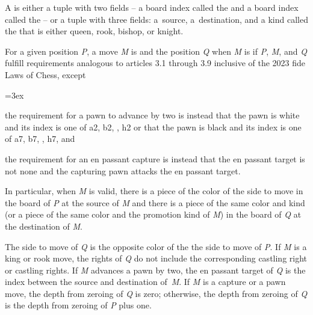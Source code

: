 \minor A  is either a tuple with two fields – a board index
called the  and a board index called the 
– or a tuple with three fields: a~source, a~destination, and a kind called
the  that is either queen, rook, bishop, or knight.

\minor For a given position {\it P}, a move {\it M} is  and the
position {\it Q}  when {\it M} is  if
{\it P}, {\it M}, and {\it Q} fulfill requirements analogous to articles 3.1
through 3.9 inclusive of the 2023 {\caps fide} Laws of Chess, except

{\leftskip=3ex

\parskip the requirement for a pawn to advance by two is instead that
the pawn is white and its index is one of a2, b2, \ellipsis\ot, h2 or that the
pawn is black and its index is one of a7, b7, \ellipsis\ot, h7, and

\parskip the requirement for an en passant capture is instead that
the en passant target is not none and the capturing pawn attacks the en passant
target.

}

In particular, when {\it M} is valid, there is a piece of the color of the side
to move in the board of {\it P} at the source of {\it M} and there is a piece
of the same color and kind (or a piece of the same color and the promotion kind
of {\it M}) in the board of {\it Q} at the destination of {\it M}.

The side to move of {\it Q} is the opposite color of the the side to move of
{\it P}. If {\it M} is a king or rook move, the rights of {\it Q} do not include
the corresponding castling right or castling rights. If {\it M} advances a pawn
by two, the en passant target of {\it Q} is the index between the source and
destination of~{\it M}. If {\it M} is a capture or a pawn move, the depth from
zeroing of {\it Q} is zero; otherwise, the depth from zeroing of {\it Q} is the
depth from zeroing of {\it P} plus one.

\def\rjust#1#2{\hbox to #1{\hfil #2}}
\def\alt{\vrule height 7.125pt depth 1.375pt width 0.7pt}

